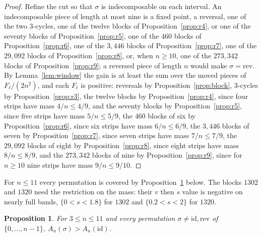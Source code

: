 \documentclass[11pt]{amsart}
\newtheorem{proposition}[theorem]{Proposition}
\theoremstyle{definition}
\theoremstyle{remark}
\numberwithin{equation}{section}
\begin{document}
\begin{proof}
Refine the cut so that $\sigma$ is indecomposable on each interval. An indecomposable piece of length at most nine is
a fixed point, a reversal, one of the two 3-cycles, one of the twelve blocks of Proposition~\ref{prop:r4}, or one of the
seventy blocks of Proposition~\ref{prop:r5}, one of the $460$ blocks of Proposition~\ref{prop:r6}, one of the
$3{,}446$ blocks of Proposition~\ref{prop:r7}, one of the $29{,}092$ blocks of Proposition~\ref{prop:r8}, or, when
$n\ge10$, one of the $273{,}342$ blocks of Proposition~\ref{prop:r9}; a reversed
piece of length $n$ would make $\sigma=\mathrm{rev}$. By Lemma~\ref{lem:window} the gain is at least the sum over the
moved pieces of $F_\ell/(2n^2)$, and each $F_\ell$ is positive: reversals by Proposition~\ref{prop:block}, 3-cycles by
Proposition~\ref{prop:r3}, the twelve blocks by Proposition~\ref{prop:r4}, since four strips have mass $4/n\le4/9$, and the
seventy blocks by Proposition~\ref{prop:r5}, since five strips have mass $5/n\le5/9$, the $460$ blocks of six by
Proposition~\ref{prop:r6}, since six strips have mass $6/n\le6/9$, the $3{,}446$ blocks of seven by
Proposition~\ref{prop:r7}, since seven strips have mass $7/n\le7/9$, the $29{,}092$ blocks of eight by
Proposition~\ref{prop:r8}, since eight strips have mass $8/n\le8/9$, and the $273{,}342$ blocks of nine by
Proposition~\ref{prop:r9}, since for $n\ge10$ nine strips have mass $9/n\le9/10$.
\end{proof}

For $n\le11$ every permutation is covered by Proposition~\ref{prop:small} below. The blocks $1302$ and $1320$ need the
restriction on the mass: their $v$ then $s$ value is negative on nearly full bands, $\{0<s<1.8\}$ for $1302$ and $\{0.2<s<2\}$ for $1320$.

\begin{proposition}\label{prop:small}
For $3\le n\le 11$ and every permutation $\sigma\ne\mathrm{id},\mathrm{rev}$ of $\{0,\dots,n-1\}$,
$A_n(\sigma)>A_n(\mathrm{id})$.
\end{proposition}
\end{document}
